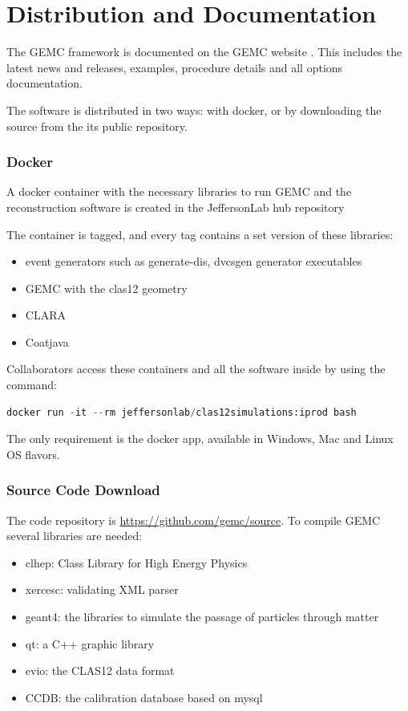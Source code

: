 \section{Distribution and Documentation}

The GEMC framework is documented on the GEMC website \cite{gemc}. This includes the latest news and releases,
examples, procedure details and all options documentation.

The software is distributed in two ways: with docker, or by downloading the source from the its public repository.

\subsubsection{Docker}

A docker container with the necessary libraries to run GEMC and the reconstruction software
is created in the JeffersonLab hub repository \cite{jlabDocker}


The container is tagged, and every tag contains a set version of these libraries:

\begin{itemize}
	\item event generators such as generate-dis, dvcsgen generator executables
	\item GEMC with the clas12 geometry
	\item CLARA
	\item Coatjava
\end{itemize}

Collaborators access these containers and all the software inside by using the command:

\begin{lstlisting}[language=Python]
docker run -it --rm jeffersonlab/clas12simulations:iprod bash
\end{lstlisting}

The only requirement is the docker app, available in Windows, Mac and Linux OS flavors.


\subsubsection{Source Code Download}

The code repository is \url{https://github.com/gemc/source}. To compile GEMC several libraries are needed:

\begin{itemize}
	\item clhep: Class Library for High Energy Physics \cite{clhep}
	\item xercesc: validating XML parser \cite{xercesc}
	\item geant4: the libraries to simulate the passage of particles through matter \cite{geant4}
	\item qt: a C++ graphic library \cite{qt}
	\item evio: the CLAS12 data format \cite{evio}
	\item CCDB: the calibration database based on mysql \cite{ccdb}
\end{itemize}


